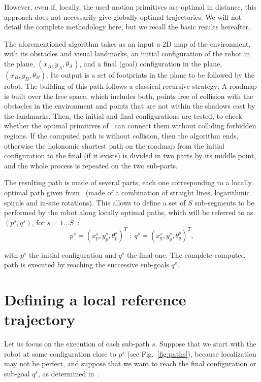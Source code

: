 However, even if, locally, the used motion primitives are optimal in distance, this approach does not necessarily give globally optimal trajectories. We will not detail the complete methodology here, but we recall the basic results hereafter.

The aforementioned algorithm takes as an input a 2D map of the environment, with its obstacles and visual landmarks, an initial configuration of the robot in the plane, $(x_A,y_A,\theta_A)$, and a final (goal) configuration in the plane, $(x_B,y_B,\theta_B)$. Its output is a set of footprints in the plane to be followed by the robot. The building of this path follows a classical recursive strategy: A roadmap is built over the free space, which includes both, points free of collision with the obstacles in the environment and points that are not within the shadows cast by the landmarks. Then, the initial and final configurations are tested, to check whether the optimal primitives of~\cite{Salaris:2010} can connect them without colliding forbidden regions. If the computed path is without collision, then the algorithm ends, otherwise the holonomic shortest path on the roadmap from the initial configuration to the final (if it exists) is divided in two parts by its middle point, and the whole process is repeated on the two sub-parts. 

The resulting path is made of several parts, each one corresponding to a locally optimal path given from~\cite{Salaris:2010} (made of a combination of straight lines, logarithmic spirals and in-site rotations). This allows to define a set of $S$ sub-segments to be performed by the robot along locally optimal paths, which will be referred to as $(p^s,q^s)$, for $s=1\dots S$~:
$$
p^s = (x_p^s,y_p^s,\theta_p^s)^T \; ; \; q^s = (x_q^s,y_q^s,\theta_q^s)^T,
$$

with $p^s$ the initial configuration and $q^s$ the final one. The complete computed path is executed by reaching the successive sub-goals $q^s$.


\section{Defining a local reference trajectory}

\label{sec:reftrajectories}

Let us focus on the execution of each sub-path $s$. Suppose that we start with the robot at some configuration close to $p^s$ (see Fig.~\ref{fig:paths}), because localization may not be perfect, and suppose that we want to reach the final configuration or sub-goal $q^s$, as determined in~\cite{jib-IJHR2010}.

